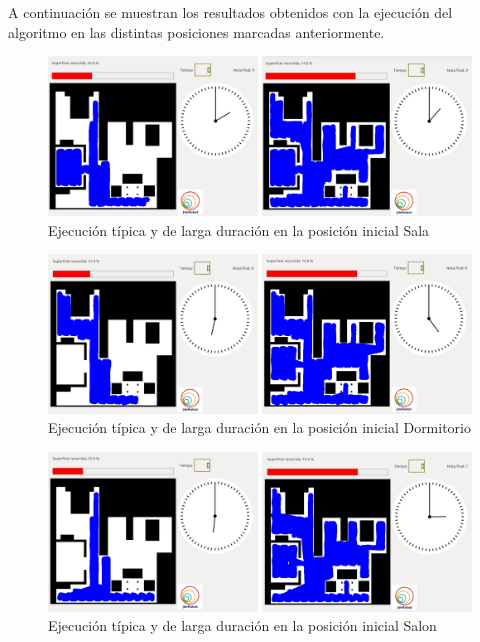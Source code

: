 A continuación se muestran los resultados obtenidos con la ejecución del algoritmo en las distintas posiciones marcadas anteriormente. 

\begin{figure}[H]
  \begin{center}
    \includegraphics[width=1.0\textwidth]{figures/Vacuum/ejecucionSala.jpg}
		\caption{Ejecución típica y de larga duración en la posición inicial Sala}
		\label{fig.ejecucionSala}
		\end{center}
\end{figure}

\begin{figure}[H]
  \begin{center}
    \includegraphics[width=1.0\textwidth]{figures/Vacuum/ejecucionHabitacion.jpg}
		\caption{Ejecución típica y de larga duración en la posición inicial Dormitorio}
		\label{fig.ejecucionDormitorio}
		\end{center}
\end{figure}

\begin{figure}[H]
  \begin{center}
    \includegraphics[width=1.0\textwidth]{figures/Vacuum/ejecucionSalon.jpg}
		\caption{Ejecución típica y de larga duración en la posición inicial Salon}
		\label{fig.ejecucionSalon}
		\end{center}
\end{figure}

